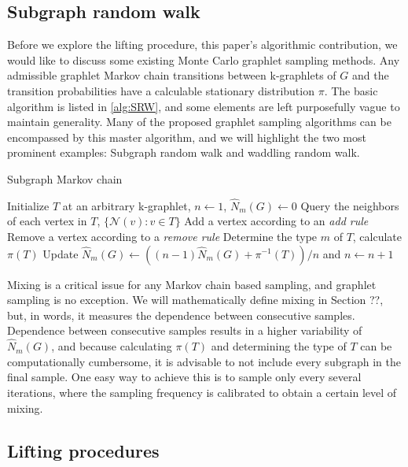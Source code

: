 \subsection{Subgraph random walk}

Before we explore the lifting procedure, this paper's algorithmic contribution, we would like to discuss some existing Monte Carlo graphlet sampling methods.
Any admissible graphlet Markov chain transitions between k-graphlets of $G$ and the transition probabilities have a calculable stationary distribution $\pi$.
The basic algorithm is listed in \ref{alg:SRW}, and some elements are left purposefully vague to maintain generality.
Many of the proposed graphlet sampling algorithms can be encompassed by this master algorithm, and we will highlight the two most prominent examples: Subgraph random walk and waddling random walk.

\begin{algorithm}
\label{alg:SMC}
\caption{Subgraph Markov chain}
\begin{algorithmic}
  \STATE Initialize $T$ at an arbitrary k-graphlet, $n \gets 1$, $\hat N_m(G) \gets 0$
  \STATE Query the neighbors of each vertex in $T$, $\{\mathcal N (v): v \in T\}$
  \STATE Add a vertex according to an {\em add rule}
  \STATE Remove a vertex according to a {\em remove rule}
  \STATE Determine the type $m$ of $T$, calculate $\pi(T)$
  \STATE Update $\hat N_m(G) \gets ((n -1) \hat N_m(G) + \pi^{-1}(T))/n$ and $n \gets n + 1$
  \ENDIF
  \ENDWHILE
\end{algorithmic}
\end{algorithm}

Mixing is a critical issue for any Markov chain based sampling, and graphlet sampling is no exception.
We will mathematically define mixing in Section ??, but, in words, it measures the dependence between consecutive samples.
Dependence between consecutive samples results in a higher variability of $\hat N_m(G)$, and because calculating $\pi(T)$ and determining the type of $T$ can be computationally cumbersome, it is advisable to not include every subgraph in the final sample.
One easy way to achieve this is to sample only every several iterations, where the sampling frequency is calibrated to obtain a certain level of mixing.



{\bf }

\subsection{Lifting procedures}

